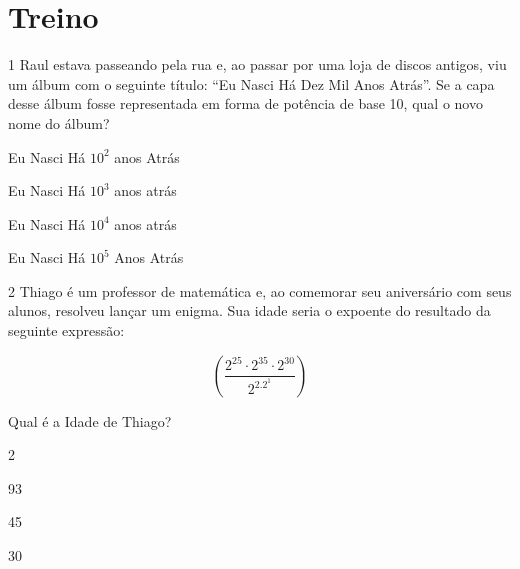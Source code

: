 
\section{Treino}

\num{1} Raul estava passeando pela rua e, ao passar por uma loja de discos
antigos, viu um álbum com o seguinte título: ``Eu Nasci Há Dez Mil Anos
Atrás''. Se a capa desse álbum fosse representada em forma de potência
de base 10, qual o novo nome do álbum?

\begin{escolha}
\item Eu Nasci Há $10^2$ anos Atrás
\item Eu Nasci Há $10^3$ anos atrás
\item Eu Nasci Há $10^4$ anos atrás
\item Eu Nasci Há $10^5$ Anos Atrás
\end{escolha}









\num{2} Thiago é um professor de matemática e, ao comemorar seu aniversário
com seus alunos, resolveu lançar um enigma. Sua idade seria o expoente
do resultado da seguinte expressão:

$$(\frac{2^{25} \cdot 2^{35} \cdot 2^{30}} {2^2.2^1})$$

Qual é a Idade de Thiago?

\begin{escolha}
\item 2
\item 93
\item 45
\item 30
\end{escolha}

